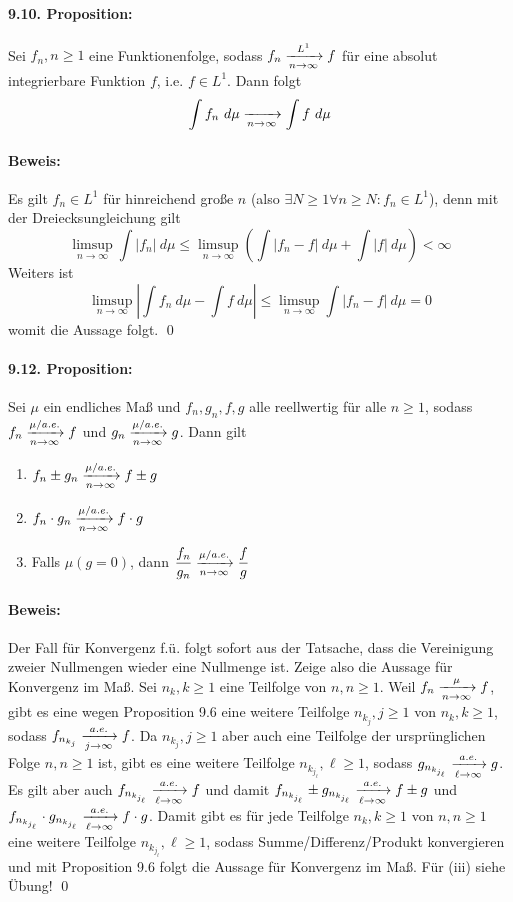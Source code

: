 \paragraph{9.10. Proposition:}Sei $f_n,n\geq1$ eine Funktionenfolge, sodass $f_n\nto{L^1}{n\to\infty}f$ f\"ur eine absolut integrierbare Funktion $f$, i.e. $f\in L^1$. Dann folgt
$$\int f_n\ d\mu\nto{}{n\to\infty}\int f\ d\mu$$

\paragraph{Beweis:}Es gilt $f_n\in L^1$ f\"ur hinreichend gro\ss{}e $n$ (also $\exists N\geq1\forall n\geq N:f_n\in L^1$), denn mit der Dreiecksungleichung gilt
$$\limsup_{n\to\infty}\int|f_n|\ d\mu\leq\limsup_{n\to\infty}\left(\int|f_n-f|\ d\mu+\int|f|\ d\mu\right)<\infty$$
Weiters ist 
$$\limsup_{n\to\infty}\left|\int f_n\ d\mu-\int f\ d\mu\right|\leq\limsup_{n\to\infty}\int|f_n-f|\ d\mu=0$$
womit die Aussage folgt. \qed

\paragraph{9.12. Proposition:}Sei $\mu$ ein endliches Ma\ss{} und $f_n,g_n,f,g$ alle reellwertig f\"ur alle $n\geq1$, sodass $f_n\nto{\mu/a.e.}{n\to\infty}f$ und $g_n\nto{\mu/a.e.}{n\to\infty}g$. Dann gilt
\begin{enumerate}[label=(\roman*)]
    \item $f_n\pm g_n\nto{\mu/a.e.}{n\to\infty}f\pm g$
    \item $f_n\cdot g_n\nto{\mu/a.e.}{n\to\infty}f\cdot g$
    \item Falls $\mu(g=0)$, dann $\dfrac{f_n}{g_n}\nto{\mu/a.e.}{n\to\infty}\dfrac{f}{g}$
\end{enumerate}

\paragraph{Beweis:} Der Fall f\"ur Konvergenz f.\"u. folgt sofort aus der Tatsache, dass die Vereinigung zweier Nullmengen wieder eine Nullmenge ist. Zeige also die Aussage f\"ur Konvergenz im Ma\ss{}.\newline\newline
Sei $n_k,k\geq1$ eine Teilfolge von $n,n\geq1$. Weil $f_n\nto{\mu}{n\to\infty}f$, gibt es eine wegen Proposition 9.6 eine weitere Teilfolge $n_{k_j},j\geq1$ von $n_k,k\geq1$, sodass $f_{n_{k_j}}\nto{a.e.}{j\to\infty}f$. Da $n_{k_j},j\geq1$ aber auch eine Teilfolge der urspr\"unglichen Folge $n,n\geq1$ ist, gibt es eine weitere Teilfolge $n_{k_{j_\ell}},\ell\geq1$, sodass $g_{n_{k_{j_\ell}}}\nto{a.e.}{\ell\to\infty}g$. Es gilt aber auch $f_{n_{k_{j_\ell}}}\nto{a.e.}{\ell\to\infty}f$ und damit $f_{n_{k_{j_\ell}}}\pm g_{n_{k_{j_\ell}}}\nto{a.e.}{\ell\to\infty}f\pm g$ und $f_{n_{k_{j_\ell}}}\cdot g_{n_{k_{j_\ell}}}\nto{a.e.}{\ell\to\infty}f\cdot g$. Damit gibt es f\"ur jede Teilfolge $n_k,k\geq1$ von $n,n\geq1$ eine weitere Teilfolge $n_{k_{j_\ell}},\ell\geq1$, sodass Summe/Differenz/Produkt konvergieren und mit Proposition 9.6 folgt die Aussage f\"ur Konvergenz im Ma\ss{}. F\"ur (iii) siehe \"Ubung! \qed

